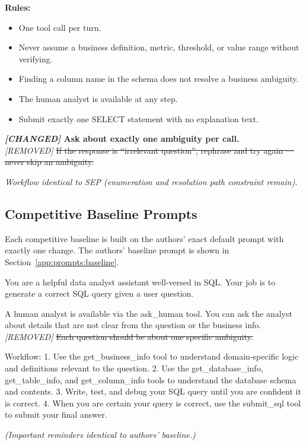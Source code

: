 \documentclass{article} %
\newcommand{\oursystem}{SEP} %
\begin{document}
\begin{tcolorbox}[promptbox, title={Abl-D --- No Retry Persistence (removes retry rule from Rules)}]
\small\ttfamily
\textbf{Rules:}
\begin{itemize}[nosep, leftmargin=1.2em]
\item One tool call per turn.
\item Never assume a business definition, metric, threshold, or value range without verifying.
\item Finding a column name in the schema does not resolve a business ambiguity.
\item The human analyst is available at any step.
\item Submit exactly one SELECT statement with no explanation text.
\end{itemize}

\textbf{\textit{[CHANGED]} Ask about exactly one ambiguity per call.}\\
\textit{[REMOVED]} \sout{If the response is ``irrelevant question'', rephrase and try again --- never skip an ambiguity.}

\textit{Workflow identical to \oursystem{} (enumeration and resolution path constraint remain).}
\end{tcolorbox}

\subsection{Competitive Baseline Prompts}
\label{app:competitive_prompts}

Each competitive baseline is built on the authors' exact default prompt with
exactly one change. The authors' baseline prompt is shown in
Section~\ref{app:prompts:baseline}.

\begin{tcolorbox}[promptbox, title={Minimal-Ask --- Removes single-topic hint from authors' baseline}]
\small\ttfamily
You are a helpful data analyst assistant well-versed in SQL. Your job is to generate a correct SQL query given a user question.

A human analyst is available via the ask\_human tool. You can ask the analyst about details that are not clear from the question or the business info.
\textit{[REMOVED]} \sout{Each question should be about one specific ambiguity.}

\medskip
Workflow:
1. Use the get\_business\_info tool to understand domain-specific logic and definitions relevant to the question.
2. Use the get\_database\_info, get\_table\_info, and get\_column\_info tools to understand the database schema and contents.
3. Write, test, and debug your SQL query until you are confident it is correct.
4. When you are certain your query is correct, use the submit\_sql tool to submit your final answer.

\textit{(Important reminders identical to authors' baseline.)}
\end{tcolorbox}
\end{document}
